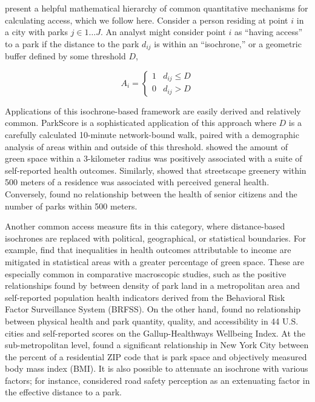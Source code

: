 \documentclass[Crown,sageh.bst]{sagej}
\begin{document}
\citet{Dong2006} present a helpful mathematical hierarchy of common
quantitative mechanisms for calculating access, which we follow here.
Consider a person residing at point \(i\) in a city with parks
\(j \in 1 \ldots J\). An analyst might consider point \(i\) as ``having
access'' to a park if the distance to the park \(d_{ij}\) is within an
``isochrone,'' or a geometric buffer defined by some threshold \(D\),

\begin{equation}\label{eq:isochrone}
A_i = \begin{cases} 
      1 & d_{ij}\leq D\\
      0 & d_{ij} > D
   \end{cases}
\end{equation}

Applications of this isochrone-based framework are easily derived and
relatively common. ParkScore \citep{parkscore2019} is a sophisticated
application of this approach where \(D\) is a carefully calculated
10-minute network-bound walk, paired with a demographic analysis of
areas within and outside of this threshold. \citet{devries2003natural}
showed the amount of green space within a 3-kilometer radius was
positively associated with a suite of self-reported health outcomes.
Similarly, \citet{devries2013streetscape} showed that streetscape
greenery within 500 meters of a residence was associated with perceived
general health. Conversely, \citet{carlson2012interactions} found no
relationship between the health of senior citizens and the number of
parks within 500 meters.

Another common access measure fits in this category, where
distance-based isochrones are replaced with political, geographical, or
statistical boundaries. For example, \citet{Mitchell2008} find that
inequalities in health outcomes attributable to income are mitigated in
statistical areas with a greater percentage of green space. These are
especially common in comparative macroscopic studies, such as the
positive relationships found by \citet{West2012} between density of park
land in a metropolitan area and self-reported population health
indicators derived from the Behavioral Risk Factor Surveillance System
(BRFSS). On the other hand, \citet{Larson2016} found no relationship
between physical health and park quantity, quality, and accessibility in
44 U.S. cities and self-reported scores on the Gallup-Healthways
Wellbeing Index. At the sub-metropolitan level, \citet{Stark2014} found
a significant relationship in New York City between the percent of a
residential ZIP code that is park space and objectively measured body
mass index (BMI). It is also possible to attenuate an isochrone with
various factors; for instance, \citet{Dias2019} considered road safety
perception as an extenuating factor in the effective distance to a park.
\end{document}
